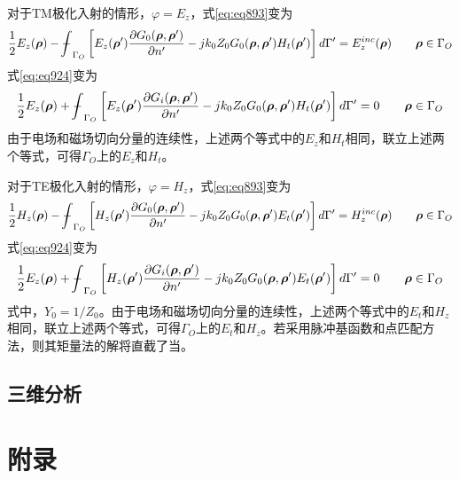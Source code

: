 \documentclass{article}
\numberwithin{equation}{section}
\renewcommand{\vec}[1]{\boldsymbol{#1}}
\begin{document}
对于TM极化入射的情形，$\varphi=E_z$，式\ref{eq:eq893}变为
\begin{align}
    \label{eq:eq925}
    \frac{1}{2}E_z(\vec{\rho})-\bbint_{\Gamma_O}\left[E_z(\vec{\rho}')\frac{\partial G_0(\vec{\rho},\vec{\rho}')}{\partial n'}-jk_0Z_0G_0(\vec{\rho},\vec{\rho}')H_t(\vec{\rho}')\right]d\Gamma'=E_z^{inc}(\vec{\rho})\qquad\vec{\rho}\in\Gamma_O
\end{align}
式\ref{eq:eq924}变为
\begin{align}
    \label{eq:eq926}
    \frac{1}{2}E_z(\vec{\rho})+\bbint_{\Gamma_O}\left[E_z(\vec{\rho}')\frac{\partial G_i(\vec{\rho},\vec{\rho}')}{\partial n'}-jk_0Z_0G_0(\vec{\rho},\vec{\rho}')H_t(\vec{\rho}')\right]d\Gamma'=0\qquad\vec{\rho}\in\Gamma_O
\end{align}
由于电场和磁场切向分量的连续性，上述两个等式中的$E_z$和$H_t$相同，联立上述两个等式，可得$\Gamma_O$上的$E_z$和$H_t$。\par
对于TE极化入射的情形，$\varphi=H_z$，式\ref{eq:eq893}变为
\begin{align}
    \label{eq:eq927}
    \frac{1}{2}H_z(\vec{\rho})-\bbint_{\Gamma_O}\left[H_z(\vec{\rho}')\frac{\partial G_0(\vec{\rho},\vec{\rho}')}{\partial n'}-jk_0Z_0G_0(\vec{\rho},\vec{\rho}')E_t(\vec{\rho}')\right]d\Gamma'=H_z^{inc}(\vec{\rho})\qquad\vec{\rho}\in\Gamma_O
\end{align}
式\ref{eq:eq924}变为
\begin{align}
    \label{eq:eq928}
    \frac{1}{2}E_z(\vec{\rho})+\bbint_{\Gamma_O}\left[H_z(\vec{\rho}')\frac{\partial G_i(\vec{\rho},\vec{\rho}')}{\partial n'}-jk_0Z_0G_0(\vec{\rho},\vec{\rho}')E_t(\vec{\rho}')\right]d\Gamma'=0\qquad\vec{\rho}\in\Gamma_O
\end{align}
式中，$Y_0=1/Z_0$。由于电场和磁场切向分量的连续性，上述两个等式中的$E_t$和$H_z$相同，联立上述两个等式，可得$\Gamma_O$上的$E_t$和$H_z$。若采用脉冲基函数和点匹配方法，则其矩量法的解将直截了当。
\subsection{三维分析}













\newpage
\renewcommand{\thesubsection}{\Alph{subsection}}
\setcounter{subsection}{0}
\setcounter{equation}{0}
\section*{\textsf{附录}}
\end{document}
